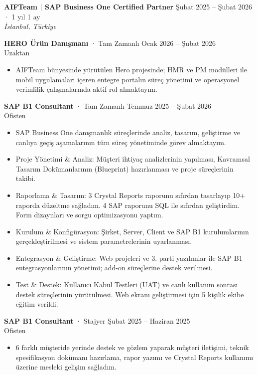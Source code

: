 \documentclass[a4paper,8pt]{article}
\begin{document}
\vspace{3pt}

\textbf{AIFTeam | SAP Business One Certified Partner} \hfill {\small Şubat 2025 -- Şubat 2026 · 1 yıl 1 ay}\\
{\small \textit{İstanbul, Türkiye}}

\vspace{3pt}
{\small \textbf{HERO Ürün Danışmanı} · Tam Zamanlı \hfill Ocak 2026 -- Şubat 2026}\\
{\small Uzaktan}
\begin{itemize}
\item {\small AIFTeam bünyesinde yürütülen Hero projesinde; HMR ve PM modülleri ile mobil uygulamaları içeren entegre portalın süreç yönetimi ve operasyonel verimlilik çalışmalarında aktif rol almaktayım.}
\end{itemize}

\vspace{3pt}
{\small \textbf{SAP B1 Consultant} · Tam Zamanlı \hfill Temmuz 2025 -- Şubat 2026}\\
{\small Ofisten}
\begin{itemize}
\item {\small SAP Business One danışmanlık süreçlerinde analiz, tasarım, geliştirme ve canlıya geçiş aşamalarının tüm süreç yönetiminde görev almaktayım.}
\item {\small Proje Yönetimi \& Analiz: Müşteri ihtiyaç analizlerinin yapılması, Kavramsal Tasarım Dokümanlarının (Blueprint) hazırlanması ve proje süreçlerinin takibi.}
\item {\small Raporlama \& Tasarım: 3 Crystal Reports raporunu sıfırdan tasarlayıp 10+ raporda düzeltme sağladım. 4 SAP raporunu SQL ile sıfırdan geliştirdim. Form dizaynları ve sorgu optimizasyonu yaptım.}
\item {\small Kurulum \& Konfigürasyon: Şirket, Server, Client ve SAP B1 kurulumlarının gerçekleştirilmesi ve sistem parametrelerinin uyarlanması.}
\item {\small Entegrasyon \& Geliştirme: Web projeleri ve 3. parti yazılımlar ile SAP B1 entegrasyonlarının yönetimi; add-on süreçlerine destek verilmesi.}
\item {\small Test \& Destek: Kullanıcı Kabul Testleri (UAT) ve canlı kullanım sonrası destek süreçlerinin yürütülmesi. Web ekranı geliştirmesi için 5 kişilik ekibe eğitim verildi.}
\end{itemize}

\vspace{3pt}
{\small \textbf{SAP B1 Consultant} · Stajyer \hfill Şubat 2025 -- Haziran 2025}\\
{\small Ofisten}
\begin{itemize}
\item {\small 6 farklı müşteride yerinde destek ve gözlem yaparak müşteri iletişimi, teknik spesifikasyon dokümanı hazırlama, rapor yazımı ve Crystal Reports kullanımı üzerine mesleki gelişim sağladım.}
\end{itemize}
\end{document}
